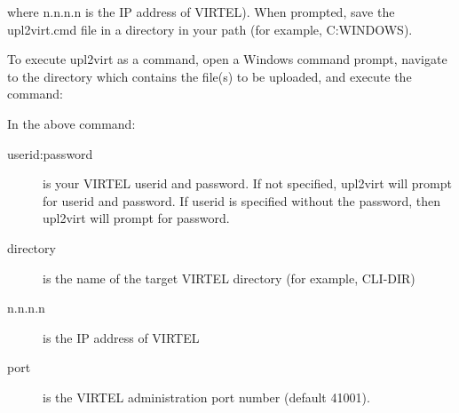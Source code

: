 \documentclass[letterpaper,10pt,english]{sphinxmanual}
\begin{document}
where n.n.n.n is the IP address of VIRTEL). When prompted, save the upl2virt.cmd file in a directory in your path (for example, C:WINDOWS).


To execute upl2virt as a command, open a Windows command prompt, navigate to the directory which contains the file(s) to be uploaded, and execute the command:

\begin{sphinxVerbatim}[commandchars=\\\{\}]
 \PYG{p}{[} \PYG{p}{]}    
         \PYG{p}{[} \PYG{p}{]} \PYG{p}{[}\PYG{p}{]} \PYG{p}{[} \PYG{p}{]} \PYG{p}{[}\PYG{p}{]} \PYG{p}{[}  \PYG{p}{]}
\end{sphinxVerbatim}

In the above command:
\begin{description}
\item[{userid:password}] \leavevmode
is your VIRTEL userid and password. If not specified, upl2virt will prompt for userid and password. If userid is specified without the password, then upl2virt will prompt for password.

\item[{directory}] \leavevmode
is the name of the target VIRTEL directory (for example, CLI-DIR)

\item[{n.n.n.n}] \leavevmode
is the IP address of VIRTEL

\item[{port}] \leavevmode
is the VIRTEL administration port number (default 41001).

\end{description}
\end{document}
